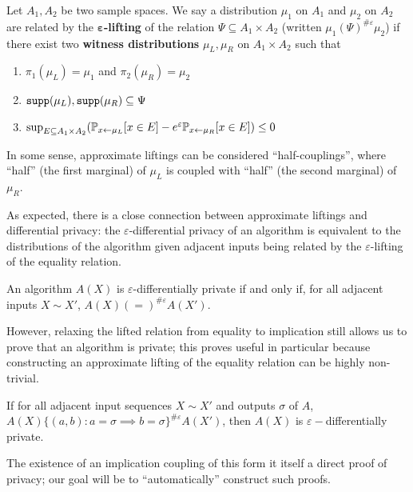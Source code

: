 \begin{defn}
    Let $A_1, A_2$ be two sample spaces. We say a distribution $\mu_1$ on $A_1$ and $\mu_2$ on $A_2$ are related by the $\mathbf{\varepsilon}$\textbf{-lifting} of the relation $\Psi\subseteq A_1\times A_2$ (written $\mu_1(\Psi)^{\#\varepsilon}\mu_2$) if there exist two \textbf{witness distributions} $\mu_L, \mu_R$ on $A_1\times A_2$ such that\begin{enumerate}
        \item $\pi_1(\mu_L) = \mu_1$ and $\pi_2(\mu_R) = \mu_2$
        \item $\texttt{supp}(\mu_L), \texttt{supp}(\mu_R)\subseteq \Psi$
        \item $\sup_{E\subseteq A_1\times A_2}(\mathbb{P}_{x\gets \mu_L}[x\in E]- e^\varepsilon \mathbb{P}_{x\gets \mu_R}[x\in E])\leq 0$
    \end{enumerate}
\end{defn}

In some sense, approximate liftings can be considered ``half-couplings'', where ``half'' (the first marginal) of $\mu_L$ is coupled with ``half'' (the second marginal) of $\mu_R$. 

As expected, there is a close connection between approximate liftings and differential privacy: the $\varepsilon$-differential privacy of an algorithm is equivalent to the distributions of the algorithm given adjacent inputs being related by the $\varepsilon$-lifting of the equality relation.

\begin{thm}
    An algorithm $A(X)$ is $\varepsilon$-differentially private if and only if, for all adjacent inputs $X\sim X'$, $A(X)(=)^{\#\varepsilon}A(X')$.
\end{thm}

However, relaxing the lifted relation from equality to implication still allows us to prove that an algorithm is private; this proves useful in particular because constructing an approximate lifting of the equality relation can be highly non-trivial. 

\begin{thm}\label{implicationcouplingthm}
    If for all adjacent input sequences $X\sim X'$ and outputs $\sigma$ of $A$, $A(X)\{(a, b): a=\sigma\implies b=\sigma\}^{\#\varepsilon}A(X')$, then $A(X)$ is $\varepsilon-$differentially private.
\end{thm}

The existence of an implication coupling of this form it itself a direct proof of privacy; our goal will be to ``automatically'' construct such proofs. 

